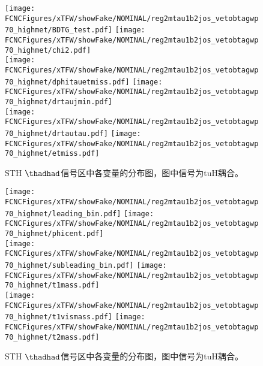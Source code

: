 \begin{figure}[H]
\centering
\texttt{[image: \\FCNCFigures/xTFW/showFake/NOMINAL/reg2mtau1b2jos\_vetobtagwp70\_highmet/BDTG\_test.pdf]}
\texttt{[image: \\FCNCFigures/xTFW/showFake/NOMINAL/reg2mtau1b2jos\_vetobtagwp70\_highmet/chi2.pdf]}
\\
\texttt{[image: \\FCNCFigures/xTFW/showFake/NOMINAL/reg2mtau1b2jos\_vetobtagwp70\_highmet/dphitauetmiss.pdf]}
\texttt{[image: \\FCNCFigures/xTFW/showFake/NOMINAL/reg2mtau1b2jos\_vetobtagwp70\_highmet/drtaujmin.pdf]}
\\
\texttt{[image: \\FCNCFigures/xTFW/showFake/NOMINAL/reg2mtau1b2jos\_vetobtagwp70\_highmet/drtautau.pdf]}
\texttt{[image: \\FCNCFigures/xTFW/showFake/NOMINAL/reg2mtau1b2jos\_vetobtagwp70\_highmet/etmiss.pdf]}
\\
\caption{STH $\thadhad$信号区中各变量的分布图，图中信号为tuH耦合。}
\label{fig:var_reg2mtau1b2jos_vetobtagwp70_highmet_1}
\end{figure}
\begin{figure}[H]
\centering
\texttt{[image: \\FCNCFigures/xTFW/showFake/NOMINAL/reg2mtau1b2jos\_vetobtagwp70\_highmet/leading\_bin.pdf]}
\texttt{[image: \\FCNCFigures/xTFW/showFake/NOMINAL/reg2mtau1b2jos\_vetobtagwp70\_highmet/phicent.pdf]}
\\
\texttt{[image: \\FCNCFigures/xTFW/showFake/NOMINAL/reg2mtau1b2jos\_vetobtagwp70\_highmet/subleading\_bin.pdf]}
\texttt{[image: \\FCNCFigures/xTFW/showFake/NOMINAL/reg2mtau1b2jos\_vetobtagwp70\_highmet/t1mass.pdf]}
\\
\texttt{[image: \\FCNCFigures/xTFW/showFake/NOMINAL/reg2mtau1b2jos\_vetobtagwp70\_highmet/t1vismass.pdf]}
\texttt{[image: \\FCNCFigures/xTFW/showFake/NOMINAL/reg2mtau1b2jos\_vetobtagwp70\_highmet/t2mass.pdf]}
\\
\caption{STH $\thadhad$信号区中各变量的分布图，图中信号为tuH耦合。}
\label{fig:var_reg2mtau1b2jos_vetobtagwp70_highmet_2}
\end{figure}
